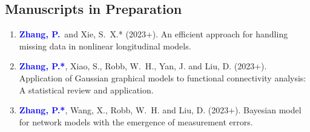 \documentclass[12pt]{article}
\newcommand{\PZ}{\textcolor{blue}{\textbf{Zhang, P.*}}}
\newcommand{\PZnot}{\textcolor{blue}{\textbf{Zhang, P.}}}
\begin{document}
	\subsection*{Manuscripts in Preparation}
	\begin{enumerate}
		\item \PZnot\ and {\sc Xie, S.\ X.*} (2023+). An efficient 
		approach for handling missing data in nonlinear longitudinal
		models.	
		
		\item \PZ, {\sc Xiao, S., Robb, W.\ H., Yan, J.} and {\sc 
		Liu, D.} (2023+).
		Application of Gaussian graphical models to functional 
		connectivity analysis: A statistical review and application.
		
		\item \PZ, {\sc Wang, X., Robb, W.\ H.} and {\sc Liu, D.} 
		(2023+). Bayesian model for network models with the 
		emergence of measurement errors.
	\end{enumerate}
	
\end{document}
